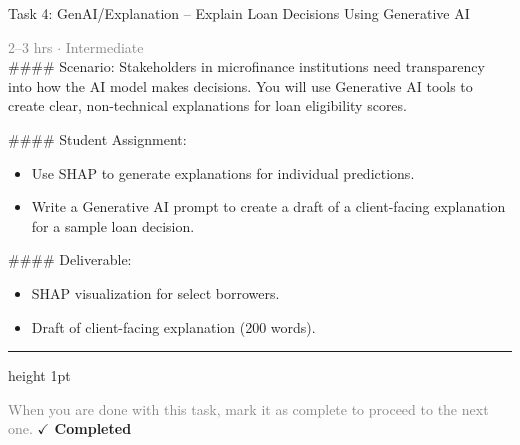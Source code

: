 \documentclass[10pt,a4paper]{article}
\begin{document}
\begin{taskbox}{Task 4: GenAI/Explanation – Explain Loan Decisions Using Generative AI}

    {\small \textcolor{gray}{2--3 hrs $\cdot$ Intermediate}}\\[12pt]

    \#\#\#\# Scenario:
Stakeholders in microfinance institutions need transparency into how the AI model makes decisions. You will use Generative AI tools to create clear, non-technical explanations for loan eligibility scores.

\#\#\#\# Student Assignment:
\begin{itemize}
    \item Use SHAP to generate explanations for individual predictions.
    \item Write a Generative AI prompt to create a draft of a client-facing explanation for a sample loan decision.
\end{itemize}

\#\#\#\# Deliverable:
\begin{itemize}
    \item SHAP visualization for select borrowers.
    \item Draft of client-facing explanation (200 words).\par
\end{itemize}

    \vspace{16pt}

    \textcolor{cardBorder}{\hrule height 1pt}\vspace{8pt}

    \small \textcolor{gray}{When you are done with this task, mark it as complete to proceed to the next one.} \hfill \textbf{\textcolor{brandDark}{$\checkmark$ Completed}}

\end{taskbox}
\end{document}

